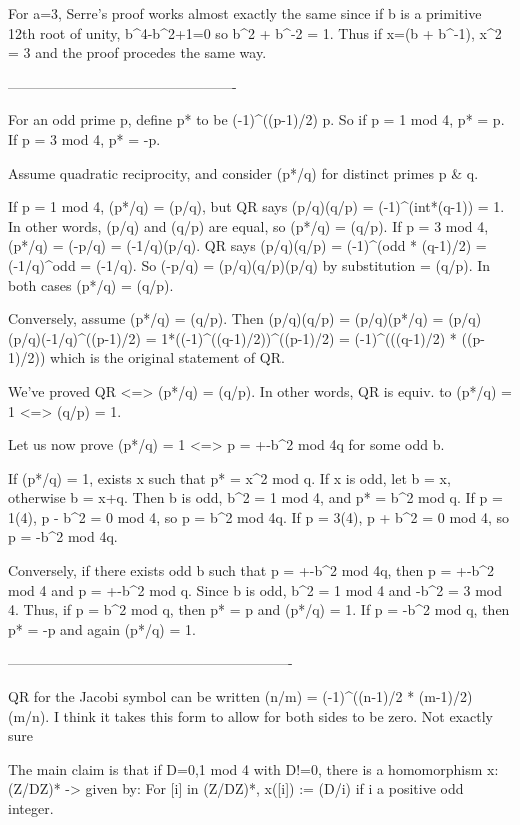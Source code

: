For a=3, Serre's proof works almost exactly the same since if b is a primitive 12th root of unity, b^4-b^2+1=0 so b^2 + b^-2 = 1. Thus if x=(b + b^-1), x^2 = 3 and the proof procedes the same way.

-------------------------------------------------

For an odd prime p, define p* to be (-1)^((p-1)/2) p. So if p = 1 mod 4, p* = p. If p = 3 mod 4, p* = -p.

Assume quadratic reciprocity, and consider (p*/q) for distinct primes p & q.

If p = 1 mod 4, (p*/q) = (p/q), but QR says (p/q)(q/p) = (-1)^(int*(q-1)) = 1.
  In other words, (p/q) and (q/p) are equal, so (p*/q) = (q/p).
If p = 3 mod 4, (p*/q) = (-p/q) = (-1/q)(p/q). QR says
  (p/q)(q/p) = (-1)^(odd * (q-1)/2)
             = (-1/q)^odd
             = (-1/q).
  So (-p/q) = (p/q)(q/p)(p/q) by substitution
            = (q/p). In both cases (p*/q) = (q/p).

Conversely, assume (p*/q) = (q/p).
Then (p/q)(q/p) = (p/q)(p*/q)
                = (p/q)(p/q)(-1/q)^((p-1)/2)
                = 1*((-1)^((q-1)/2))^((p-1)/2)
                = (-1)^(((q-1)/2) * ((p-1)/2))
which is the original statement of QR.

We've proved QR <=> (p*/q) = (q/p).
In other words, QR is equiv. to (p*/q) = 1 <=> (q/p) = 1.

Let us now prove (p*/q) = 1 <=> p = +-b^2 mod 4q for some odd b.

If (p*/q) = 1, exists x such that p* = x^2 mod q. If x is odd,
let b = x, otherwise b = x+q. Then b is odd, b^2 = 1 mod 4, and
p* = b^2 mod q.
  If p = 1(4), p - b^2 = 0 mod 4, so p = b^2 mod 4q.
  If p = 3(4), p + b^2 = 0 mod 4, so p = -b^2 mod 4q.

Conversely, if there exists odd b such that
p = +-b^2 mod 4q, then
p = +-b^2 mod 4 and p = +-b^2 mod q.
Since b is odd, b^2 = 1 mod 4 and -b^2 = 3 mod 4.
Thus, if p = b^2 mod q, then p* = p and (p*/q) = 1.
If p = -b^2 mod q, then p* = -p and again (p*/q) = 1.

-------------------------------------------------------------

QR for the Jacobi symbol can be written
  (n/m) = (-1)^((n-1)/2 * (m-1)/2) (m/n).
I think it takes this form to allow for both sides to be zero. Not exactly sure

The main claim is that if D=0,1 mod 4 with D!=0, there is a homomorphism
x:(Z/DZ)* -> {} given by:
  For [i] in (Z/DZ)*, x([i]) := (D/i) if i a positive odd integer.

